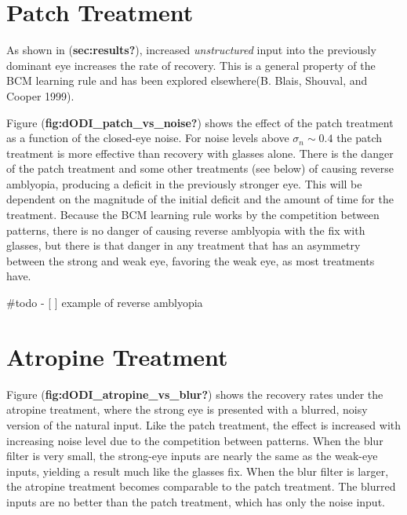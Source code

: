 \documentclass[
  letterpaper,
  DIV=11,
  numbers=noendperiod]{scrreprt}
\begin{document}
\hypertarget{patch-treatment-1}{%
\section*{Patch Treatment}\label{patch-treatment-1}}

As shown in (\textbf{sec:results?}), increased \emph{unstructured} input
into the previously dominant eye increases the rate of recovery. This is
a general property of the BCM learning rule and has been explored
elsewhere(B. Blais, Shouval, and Cooper 1999).

Figure (\textbf{fig:dODI\_patch\_vs\_noise?}) shows the effect of the
patch treatment as a function of the closed-eye noise. For noise levels
above \(\sigma_n \sim 0.4\) the patch treatment is more effective than
recovery with glasses alone. There is the danger of the patch treatment
and some other treatments (see below) of causing reverse amblyopia,
producing a deficit in the previously stronger eye. This will be
dependent on the magnitude of the initial deficit and the amount of time
for the treatment. Because the BCM learning rule works by the
competition between patterns, there is no danger of causing reverse
amblyopia with the fix with glasses, but there is that danger in any
treatment that has an asymmetry between the strong and weak eye,
favoring the weak eye, as most treatments have.

\#todo - {[} {]} example of reverse amblyopia

\hypertarget{atropine-treatment-1}{%
\section*{Atropine Treatment}\label{atropine-treatment-1}}

Figure (\textbf{fig:dODI\_atropine\_vs\_blur?}) shows the recovery rates
under the atropine treatment, where the strong eye is presented with a
blurred, noisy version of the natural input. Like the patch treatment,
the effect is increased with increasing noise level due to the
competition between patterns. When the blur filter is very small, the
strong-eye inputs are nearly the same as the weak-eye inputs, yielding a
result much like the glasses fix. When the blur filter is larger, the
atropine treatment becomes comparable to the patch treatment. The
blurred inputs are no better than the patch treatment, which has only
the noise input.
\end{document}
